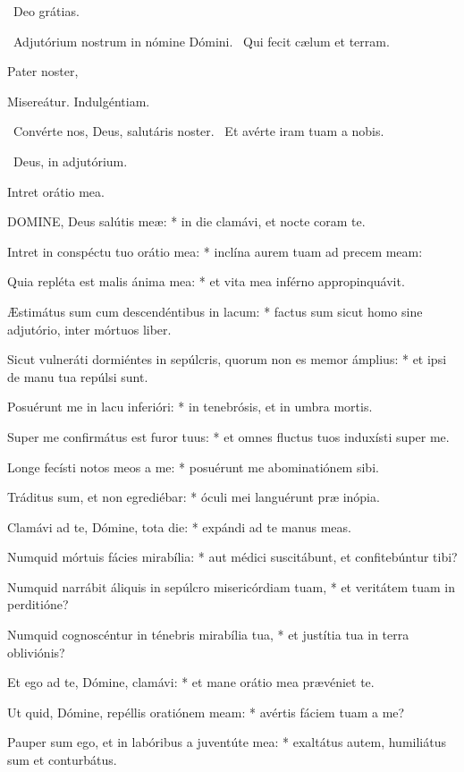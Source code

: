 \R\ Deo grátias.

\V\ Adjutórium nostrum in nómine Dómini. \R\ Qui fecit cælum et terram.

Pater noster, 

 Misereátur. Indulgéntiam.

\V\ Convérte nos, Deus, salutáris noster. \R\ Et avérte iram tuam a nobis.

\V\ Deus, in adjutórium.

 Intret orátio mea.


\lettrine[lines=2]{D}{OMINE}, Deus salútis meæ: * in die clamávi, et nocte coram te.

Intret in conspéctu tuo orátio mea: * inclína aurem tuam ad precem meam:

Quia repléta est malis ánima mea: * et vita mea inférno appropinquávit.

Æstimátus sum cum descendéntibus in lacum: * factus sum sicut homo sine adjutório, inter mórtuos liber.

Sicut vulneráti dormiéntes in sepúlcris, quorum non es memor ámplius: * et ipsi de manu tua repúlsi sunt.

Posuérunt me in lacu inferióri: * in tenebrósis, et in umbra mortis.

Super me confirmátus est furor tuus: * et omnes fluctus tuos induxísti super me.

Longe fecísti notos meos a me: * posuérunt me abominatiónem sibi.

Tráditus sum, et non egrediébar: * óculi mei languérunt præ inópia.

Clamávi ad te, Dómine, tota die: * expándi ad te manus meas.

Numquid mórtuis fácies mirabília: * aut médici suscitábunt, et confitebúntur tibi?

Numquid narrábit áliquis in sepúlcro misericórdiam tuam, * et veritátem tuam in perditióne?

Numquid cognoscéntur in ténebris mirabília tua, * et justítia tua in terra obliviónis?

Et ego ad te, Dómine, clamávi: * et mane orátio mea prævéniet te.

Ut quid, Dómine, repéllis oratiónem meam: * avértis fáciem tuam a me?

Pauper sum ego, et in labóribus a juventúte mea: * exaltátus autem, humiliátus sum et conturbátus.

